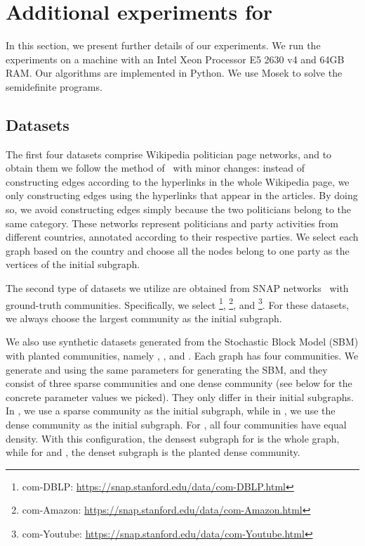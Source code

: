 \section{Additional experiments for \dskc}
\label{sec:add-exp:dense}

In this section, we present further details of our experiments. 
We run the experiments on a machine with an Intel Xeon Processor E5 2630 v4 and 
64GB RAM. Our algorithms are implemented in Python. 
We use Mosek to solve the semidefinite programs. 

\subsection{Datasets}
\label{sec:add-exp:data}

The first four datasets comprise Wikipedia politician page networks, and to
obtain them we follow the method of~\citet{neumann2022sublinear} with minor
changes: 
instead of constructing edges according to the hyperlinks in the whole Wikipedia page, 
we only constructing edges using the hyperlinks that appear in the articles.
By doing so, we avoid constructing edges simply because the two politicians belong to the same category. 
These networks represent politicians and party activities from different countries, 
annotated according to their respective parties. 
We select each graph based on the country and choose all the nodes belong to one party 
as the vertices of the initial subgraph. 

The second type of datasets we utilize are obtained from SNAP networks~\citep{snapnets} with ground-truth communities. 
Specifically, we select \dblp\footnote{com-DBLP: \url{https://snap.stanford.edu/data/com-DBLP.html}}, 
\amazon\footnote{com-Amazon: \url{https://snap.stanford.edu/data/com-Amazon.html}}, and 
\youtube\footnote{com-Youtube: \url{https://snap.stanford.edu/data/com-Youtube.html}}. 
For these datasets, we always choose the largest community as the initial subgraph.

We also use synthetic datasets generated from the Stochastic Block Model (SBM) with planted communities, 
namely \balanced, \sparse, and \dense. Each graph has four communities. 
We generate \sparse and \dense using the same parameters for generating the SBM,
and they consist of three sparse communities and one dense community (see below
for the concrete parameter values we picked). They only differ in their initial subgraphs.
In \sparse, we use a sparse community as the initial subgraph,
while in \dense, we use the dense community as the initial subgraph. 
For \balanced, all four communities have equal density.
With this configuration, the densest subgraph for \balanced is the whole graph,
while for \sparse and \dense, the denset subgraph is the planted dense community.


